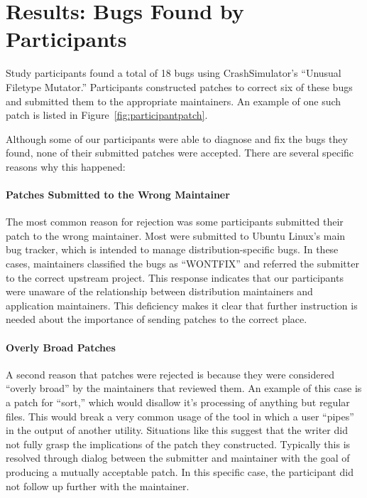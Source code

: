 \section{Results: Bugs Found by Participants}
\label{subsec:bugs-by-participants}
Study participants found a total of 18 bugs using CrashSimulator's
``Unusual Filetype Mutator.''
Participants constructed patches to correct six of these bugs and submitted
them to the appropriate maintainers.
An example of one such patch is listed in Figure~\ref{fig:participantpatch}.

Although some of our participants were able to diagnose and fix the bugs they found,
none of their submitted patches were accepted.
There are several specific reasons why this happened:

\paragraph{Patches Submitted to the Wrong Maintainer}
The most common reason for rejection was some participants submitted their patch to the wrong maintainer.
Most were submitted to Ubuntu Linux's main bug tracker, which is intended to manage distribution-specific bugs.
In these cases,
maintainers classified the bugs as ``WONTFIX'' and referred the submitter to the correct upstream project.
This response indicates that our participants were unaware of the relationship between distribution maintainers and application maintainers.
This deficiency makes it clear that further instruction is needed about the importance of sending patches to the correct place.

\paragraph{Overly Broad Patches}
A second reason that patches were rejected is because they were considered ``overly broad'' by the maintainers that reviewed them.
An example of this case is a patch for ``sort,'' which would disallow it's processing of anything but regular files.
This would break a very common usage of the tool in which a user ``pipes'' in the output of another utility.
Situations like this suggest that the writer did not fully grasp the implications of the patch they constructed.
Typically this is resolved through dialog between the submitter and maintainer with the goal of producing a mutually acceptable patch.
In this specific case, the participant did not follow up further with the maintainer.


